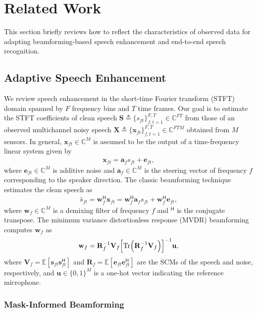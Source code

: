 \documentclass[a4paper]{article}
\newcommand{\R}{\R}
\def\hr{\mathsf{H}}
\def\Tr{\mathrm{Tr}}
\def\R{\mathbf{R}}
\def\S{\mathbf{S}}
\def\V{\mathbf{V}}
\def\X{\mathbf{X}}
\def\a{\mathbf{a}}
\def\e{\mathbf{e}}
\def\s{\mathbf{s}}
\def\u{\mathbf{u}}
\def\w{\mathbf{w}}
\def\x{\mathbf{x}}
\begin{document}
\section{Related Work}
\label{sec:related_work}
This section briefly reviews
 how to reflect the characteristics of observed data
 for adapting beamforming-based speech enhancement
 and end-to-end speech recognition.

\subsection{Adaptive Speech Enhancement}
\label{sec:conventional_beamformer}

We review speech enhancement in the short-time Fourier transform (STFT) domain
 spanned by $F$ frequency bins and $T$ time frames.
Our goal is to estimate 
 the STFT coefficients of clean speech $\S \!\triangleq\! \{s_{ft}\}_{f,t=1}^{F,T} \!\in\! \mathbb{C}^{FT}$
 from those of an observed multichannel noisy speech 
 $\X \!\triangleq\! \{\x_{ft}\}_{f,t=1}^{F,T} \!\in\! \mathbb{C}^{FTM}$ obtained from $M$ sensors.
In general, 
 $\x_{ft} \!\in\! \mathbb{C}^{M}$ 
 is assumed to be the output of a time-frequency linear system given by
\begin{align}
  \x_{ft} = \a_f s_{ft} + \e_{ft}, \label{eq:mixModel_timeInvA}
\end{align}
where
$\e_{ft} \in \mathbb{C}^{M}$ is additive noise and
$\a_f \in \mathbb{C}^M$
 is the steering vector of frequency $f$
 corresponding to the speaker direction.
The classic beamforming technique
 estimates the clean speech as
\begin{align}
  \hat{s}_{ft} 
  = \w_f^\hr \x_{ft} 
  = \w_f^\hr \a_f s_{ft} + \w_f^\hr \e_{ft},
\end{align}
where $\w_f \!\in\! \mathbb{C}^M$ is a demixing filter of frequency $f$
 and $^\hr$ is the conjugate transpose.
The
 minimum variance distortionless response (MVDR) beamforming \cite{souden_optimal_2010}
 computes $\w_f$ as
\begin{align}
  \w_f = \R_f^{-1} \V_f \qty[\Tr \qty(\R_f^{-1} \V_f)]^{-1} \u,
  \label{eq:mvdr2}
\end{align}
where
 $\V_f \!=\! \mathbb{E}[\s_{ft}\s_{ft}^\hr]$ and 
 $\R_f \!=\! \mathbb{E}[\e_{ft}\e_{ft}^\hr]$ are the SCMs of the speech and noise, respectively,
 and $\u \in \{0, 1\}^M$ is a one-hot vector 
 indicating the reference microphone.

\subsubsection{Mask-Informed Beamforming}
\end{document}
